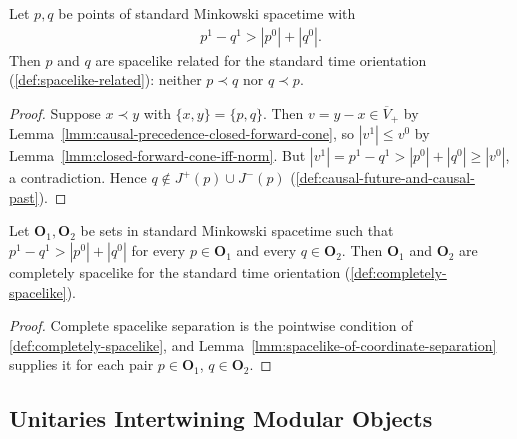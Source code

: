 \begin{lemma}
    \label{lmm:spacelike-of-coordinate-separation}
    \leanok
    Let $p, q$ be points of standard Minkowski spacetime with
    \begin{align}
        p^1 - q^1 > |p^0| + |q^0|.
    \end{align}
    Then $p$ and $q$ are spacelike related for the standard time orientation (\ref{def:spacelike-related}): neither $p \prec q$ nor $q \prec p$.
\end{lemma}
\begin{proof}
    \leanok
    Suppose $x \prec y$ with $\{x, y\} = \{p, q\}$. Then $v = y - x \in \overline{V}_+$ by Lemma~\ref{lmm:causal-precedence-closed-forward-cone}, so $|v^1| \le v^0$ by Lemma~\ref{lmm:closed-forward-cone-iff-norm}. But $|v^1| = p^1 - q^1 > |p^0| + |q^0| \ge |v^0|$, a contradiction. Hence $q \notin J^+(p) \cup J^-(p)$ (\ref{def:causal-future-and-causal-past}).
\end{proof}

\begin{corollary}
    \label{crllr:completely-spacelike-of-coordinate-separation}
    \leanok
    Let $\mathbf{O}_1, \mathbf{O}_2$ be sets in standard Minkowski spacetime such that $p^1 - q^1 > |p^0| + |q^0|$ for every $p \in \mathbf{O}_1$ and every $q \in \mathbf{O}_2$. Then $\mathbf{O}_1$ and $\mathbf{O}_2$ are completely spacelike for the standard time orientation (\ref{def:completely-spacelike}).
\end{corollary}
\begin{proof}
    \leanok
    Complete spacelike separation is the pointwise condition of \ref{def:completely-spacelike}, and Lemma~\ref{lmm:spacelike-of-coordinate-separation} supplies it for each pair $p \in \mathbf{O}_1$, $q \in \mathbf{O}_2$.
\end{proof}

\subsection{Unitaries Intertwining Modular Objects}\label{sbsctn:unitary-intertwining-modular}

